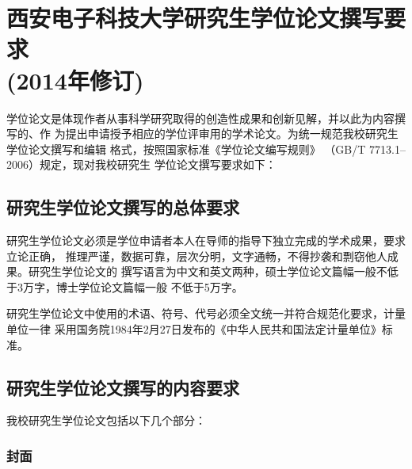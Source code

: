 

\chapter[2014年版研究生学位论文撰写要求]{西安电子科技大学研究生学位论文撰写要
  求\\(2014年修订)}

学位论文是体现作者从事科学研究取得的创造性成果和创新见解，并以此为内容撰写的、作
为提出申请授予相应的学位评审用的学术论文。为统一规范我校研究生学位论文撰写和编辑
格式，按照国家标准《学位论文编写规则》 （GB/T 7713.1--2006）规定，现对我校研究生
学位论文撰写要求如下：

\section{研究生学位论文撰写的总体要求}

研究生学位论文必须是学位申请者本人在导师的指导下独立完成的学术成果，要求立论正确，
推理严谨，数据可靠，层次分明，文字通畅，不得抄袭和剽窃他人成果。研究生学位论文的
撰写语言为中文和英文两种，硕士学位论文篇幅一般不低于3万字，博士学位论文篇幅一般
不低于5万字。

研究生学位论文中使用的术语、符号、代号必须全文统一并符合规范化要求，计量单位一律
采用国务院1984年2月27日发布的《中华人民共和国法定计量单位》标准。

\section{研究生学位论文撰写的内容要求}

我校研究生学位论文包括以下几个部分：

\subsection{封面}

